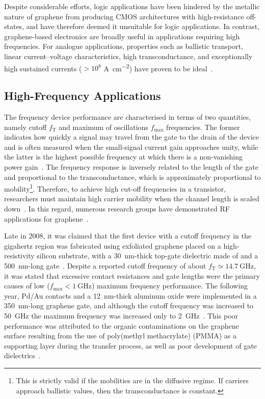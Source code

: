 Despite considerable efforts, logic applications have been hindered by the metallic nature of graphene from producing \gls{CMOS} architectures with high-resistance off-states, and have therefore deemed it unsuitable for logic applications. In contrast, graphene-based electronics are broadly useful in applications requiring high frequencies. For analogue applications, properties such as ballistic transport, linear current--voltage characteristics, high transconductance, and exceptionally high sustained currents ($> 10^8$ \si{\ampere\per\square\centi\metre}) have proven to be ideal~\cite{meric2008rf, meric2008current}.

\subsection{High-Frequency Applications}

The frequency device performance are characterised in terms of two quantities, namely cutoff $f_\textrm{T}$ and maximum of oscillations $f_\textrm{max}$ frequencies. The former indicates how quickly a signal may travel from the gate to the drain of the device and is often measured when the small-signal current gain approaches unity, while the latter is the highest possible frequency at which there is a non-vanishing power gain~\cite{schwierz2010graphene}.
The frequency response is inversely related to the length of the gate and proportional to the transconductance, which is approximately proportional to mobility\footnote[2]{This is strictly valid if the mobilities are in the diffusive regime. If carriers approach ballistic values, then the transconductance is constant.}. Therefore, to achieve high cut-off frequencies in a transistor, researchers must maintain high carrier mobility when the channel length is scaled down~\cite{schwierz2013graphene}. In this regard, numerous research groups have demonstrated \gls{RF} applications for graphene~\cite{colmiais2022towards, liao2012graphene, lin2009operation}.

Late in 2008, it was claimed that the first device with a cutoff frequency in the gigahertz region was fabricated using exfoliated graphene placed on a high-resistivity silicon substrate, with a \SI{30}{\nano\metre}-thick top-gate dielectric made of  and a \SI{500}{\nano\metre}-long gate~\cite{meric2008rf}. Despite a reported cutoff frequency of about $f_\textrm{T}\simeq\SI{14.7}{\giga\hertz}$, it was stated that excessive contact resistances and gate lengths were the primary causes of low ($f_\textrm{max}<\SI{1}{\giga\hertz}$) maximum frequency performance. The following year, Pd/Au contacts and a \SI{12}{\nano\metre}-thick aluminum oxide were implemented in a \SI{350}{\nano\metre}-long graphene gate, and although the cutoff frequency was increased to \SI{50}{\giga\hertz} the maximum frequency was increased only to \SI{2}{\giga\hertz}~\cite{lin2009development}. This poor performance was attributed to the organic contaminations on the graphene surface resulting from the use of poly(methyl methacrylate) (PMMA) as a supporting layer during the transfer process, as well as poor development of gate dielectrics~\cite{jang2014improved}.

